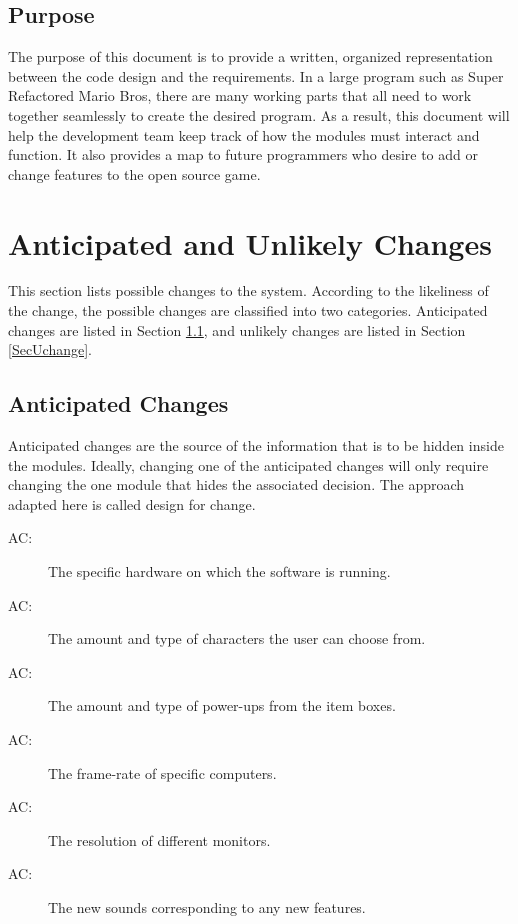 \documentclass[12pt, titlepage]{article}
\newcounter{acnum}
\newcommand{\actheacnum}{AC\theacnum}
\begin{document}
\subsection{Purpose}

The purpose of this document is to provide a written, organized representation between the code design and the requirements. In a large program such as Super Refactored Mario Bros, there are many working parts that all need to work together seamlessly to create the desired program. As a result, this document will help the development team keep track of how the modules must interact and function. It also provides a map to future programmers who desire to add or change features to the open source game.

\section{Anticipated and Unlikely Changes} \label{SecChange}

This section lists possible changes to the system. According to the likeliness
of the change, the possible changes are classified into two
categories. Anticipated changes are listed in Section \ref{SecAchange}, and
unlikely changes are listed in Section \ref{SecUchange}.

\subsection{Anticipated Changes} \label{SecAchange}

Anticipated changes are the source of the information that is to be hidden
inside the modules. Ideally, changing one of the anticipated changes will only
require changing the one module that hides the associated decision. The approach
adapted here is called design for
change.

\begin{description}
\item[ \actheacnum \label{acHardware}:] The specific hardware on which the software is running.
\item[ \actheacnum \label{acCharacters}:] The amount and type of characters the user can choose from. 
\item[ \actheacnum \label{acPower}:] The amount and type of power-ups from the item boxes.
\item[ \actheacnum \label{acSpeed}:] The frame-rate of specific computers.
\item[ \actheacnum \label{acRes}:] The resolution of different monitors.
\item[ \actheacnum \label{acSound}:] The new sounds corresponding to any new features.
\end{description}
\end{document}
